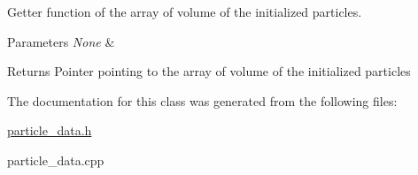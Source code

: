 Getter function of the array of volume of the initialized particles. 


\begin{DoxyParams}{Parameters}
{\em None} & \\
\hline
\end{DoxyParams}
\begin{DoxyReturn}{Returns}
Pointer pointing to the array of volume of the initialized particles 
\end{DoxyReturn}


The documentation for this class was generated from the following files\-:\begin{DoxyCompactItemize}
\item 
\hyperlink{particle__data_8h}{particle\-\_\-data.\-h}\item 
particle\-\_\-data.\-cpp\end{DoxyCompactItemize}
